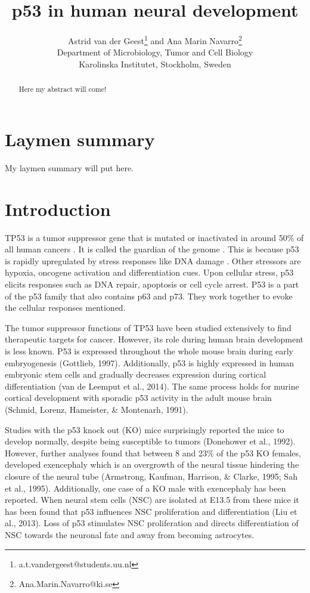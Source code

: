 \documentclass[11pt,a4paper]{article}
\title{p53 in human neural development}
\author{Astrid van der Geest\thanks{a.t.vandergeest@students.uu.nl} and Ana Marin Navarro\thanks{Ana.Marin.Navarro@ki.se}\\ Department of Microbiology, Tumor and Cell Biology\\ Karolinska Institutet, Stockholm, Sweden}
\begin{document}
\maketitle


\begin{abstract}
Here my abstract will come!
\end{abstract}

\section{Laymen summary \label{intro}}

My laymen summary will put here. 

\section{Introduction \label{intro}}

TP53 is a tumor suppressor gene that is mutated or inactivated in around 50\% of all human cancers \cite{Bouaoun2016}. It is called the guardian of the genome \cite{Lane1992a}. This is because p53 is rapidly upregulated by stress responses like DNA damage \cite{Zilfou2009}. Other stressors are hypoxia, oncogene activation and differentiation cues. Upon cellular stress, p53 elicits responses such as DNA repair, apoptosis or cell cycle arrest. P53 is a part of the p53 family that also contains p63 and p73. They work together to evoke the cellular responses mentioned. 

The tumor suppressor functions of TP53 have been studied extensively to find therapeutic targets for cancer. However, its role during human brain development is less known. P53 is expressed throughout the whole mouse brain during early embryogenesis (Gottlieb, 1997). Additionally, p53 is highly expressed in human embryonic stem cells and gradually decreases expression during cortical differentiation (van de Leemput et al., 2014). The same process holds for murine cortical development with sporadic p53 activity in the adult mouse brain (Schmid, Lorenz, Hameister, \& Montenarh, 1991). 

Studies with the p53 knock out (KO) mice surprisingly reported the mice to develop normally, despite being susceptible to tumors (Donehower et al., 1992). However, further analyses found that between 8 and 23\% of the p53 KO females, developed exencephaly which is an overgrowth of the neural tissue hindering the closure of the neural tube (Armstrong, Kaufman, Harrison, \& Clarke, 1995; Sah et al., 1995). Additionally, one case of a KO male with exencephaly has been reported. When neural stem cells (NSC) are isolated at E13.5 from these mice it has been found that p53 influences NSC proliferation and differentiation (Liu et al., 2013). Loss of p53 stimulates NSC proliferation and directs differentiation of NSC towards the neuronal fate and away from becoming astrocytes. 
\end{document}
